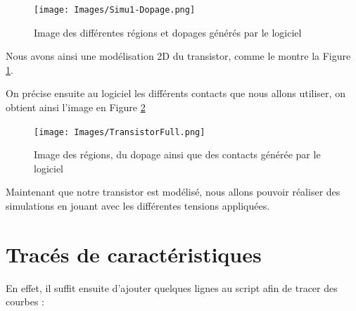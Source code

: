 \documentclass[a4paper,11pt]{report}
\begin{document}
\begin{figure}[H]
\centering
\texttt{[image: Images/Simu1-Dopage.png]}
\caption{Image des différentes régions et dopages générés par le logiciel}
\label{transistortonyplot}
\end{figure}

Nous avons ainsi une modélisation 2D du transistor, comme le montre la Figure \ref{transistortonyplot}.

On précise ensuite au logiciel les différents contacts que nous allons utiliser, on obtient ainsi l'image en Figure \ref{TransistorFull}

\begin{figure}[H]
    \centering
    \texttt{[image: Images/TransistorFull.png]}
    \caption{Image des régions, du dopage ainsi que des contacts générée par le logiciel}
    \label{TransistorFull}
\end{figure}

Maintenant que notre transistor est modélisé, nous allons pouvoir réaliser des simulations en jouant avec les différentes tensions appliquées.
\vspace{1cm}

\section{Tracés de caractéristiques}

En effet, il suffit ensuite d'ajouter quelques lignes au script afin de tracer des courbes :

\begin{code}[H]
\noindent{}
\caption{Mise en place des simulations}
\end{code}
\end{document}
